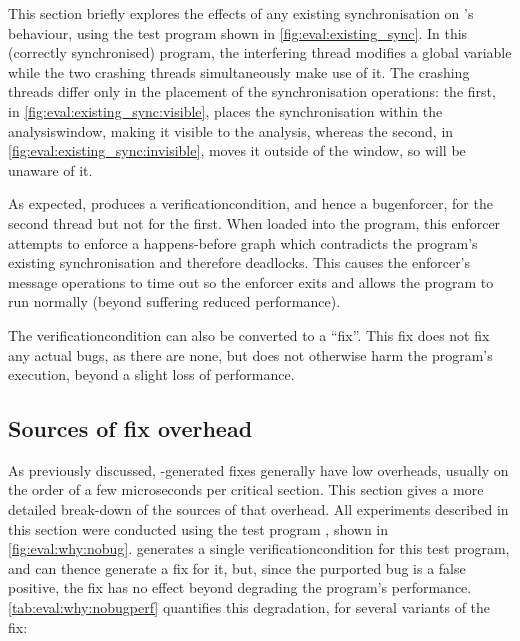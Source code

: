 \noindent
This section briefly explores the effects of any existing
synchronisation on {\technique}'s behaviour, using the test program
shown in \autoref{fig:eval:existing_sync}.  In this (correctly
synchronised) program, the interfering thread modifies a global
variable while the two crashing threads simultaneously make use of it.
The crashing threads differ only in the placement of the
synchronisation operations: the first, in
\autoref{fig:eval:existing_sync:visible}, places the synchronisation
within the \gls{analysiswindow}, making it visible to the {\technique}
analysis, whereas the second, in
\autoref{fig:eval:existing_sync:invisible}, moves it outside of the
window, so {\technique} will be unaware of it.

As expected, {\implementation} produces a \gls{verificationcondition}, and
hence a \gls{bugenforcer}, for the second thread but not for the
first.  When loaded into the program, this enforcer attempts to
enforce a happens-before graph which contradicts the program's
existing synchronisation and therefore deadlocks.  This causes the
enforcer's message operations to time out so the enforcer exits
and allows the program to run normally (beyond suffering reduced
performance).

The \gls{verificationcondition} can also be converted to a ``fix''.
This fix does not fix any actual bugs, as there are none, but does not
otherwise harm the program's execution, beyond a slight loss of
performance.

\subsection{Sources of fix overhead}
\label{sect:eval:why:fix_overhead}

As previously discussed, {\implementation}-generated fixes generally have
low overheads, usually on the order of a few microseconds per critical
section.  This section gives a more detailed break-down of the sources
of that overhead.  All experiments described in this section were
conducted using the test program , shown in
\autoref{fig:eval:why:nobug}.  {\implementation} generates a single
\gls{verificationcondition} for this test program, and can thence
generate a fix for it, but, since the purported bug is a false
positive, the fix has no effect beyond degrading the program's
performance.  \autoref{tab:eval:why:nobugperf} quantifies this
degradation, for several variants of the fix:


